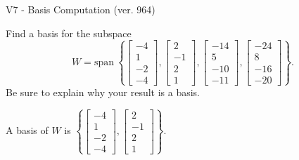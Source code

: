 \begin{exercise}
  \begin{exerciseTitle}V7 - Basis Computation (ver. 964)\end{exerciseTitle}
  \begin{exerciseStatement}
    Find a basis for the subspace 
\[W=\mathrm{span}\ \left\{\left[\begin{array}{r}
-4 \\
1 \\
-2 \\
-4
\end{array}\right] , \left[\begin{array}{r}
2 \\
-1 \\
2 \\
1
\end{array}\right] , \left[\begin{array}{r}
-14 \\
5 \\
-10 \\
-11
\end{array}\right] , \left[\begin{array}{r}
-24 \\
8 \\
-16 \\
-20
\end{array}\right]\right\}.\]
 Be sure to explain why your result is a basis.


  \end{exerciseStatement}
  \begin{exerciseAnswer}
   A basis of \(W\) is  \(\left\{\left[\begin{array}{r}
-4 \\
1 \\
-2 \\
-4
\end{array}\right] , \left[\begin{array}{r}
2 \\
-1 \\
2 \\
1
\end{array}\right]\right\}\).
  


  \end{exerciseAnswer}
\end{exercise}